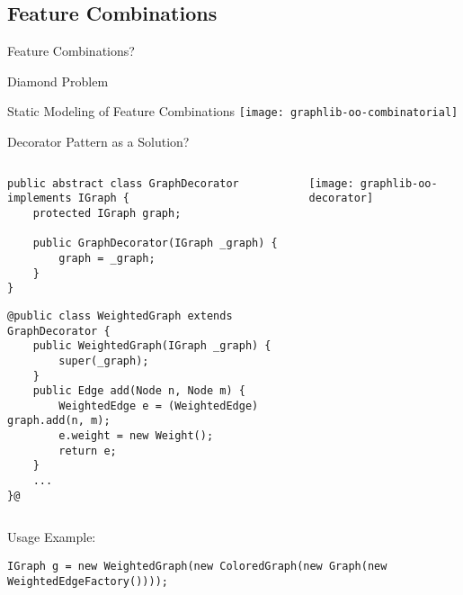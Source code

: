 \subsection{Feature Combinations}
\begin{frame}{Feature Combinations?}
\end{frame}

\begin{frame}{Diamond Problem}
\end{frame}

\begin{frame}{Static Modeling of Feature Combinations}
	\texttt{[image: graphlib-oo-combinatorial]}
\end{frame}

\begin{frame}[fragile]{Decorator Pattern as a Solution?}
		\begin{columns}
\begin{tiny}
\begin{lstlisting}
public abstract class GraphDecorator implements IGraph {
	protected IGraph graph;
	
	public GraphDecorator(IGraph _graph) { 
		graph = _graph; 
	}
}
\end{lstlisting}
\begin{lstlisting}
@public class WeightedGraph extends GraphDecorator {
	public WeightedGraph(IGraph _graph) {
		super(_graph);
	}
	public Edge add(Node n, Node m) {
		WeightedEdge e = (WeightedEdge) graph.add(n, m);
		e.weight = new Weight();
		return e;
	}
	...
}@
\end{lstlisting}
\end{tiny}	
				\texttt{[image: graphlib-oo-decorator]}	
		\end{columns}
Usage Example: 
\begin{tiny}
\begin{lstlisting}
IGraph g = new WeightedGraph(new ColoredGraph(new Graph(new WeightedEdgeFactory())));
\end{lstlisting}
\end{tiny}	
\end{frame}


